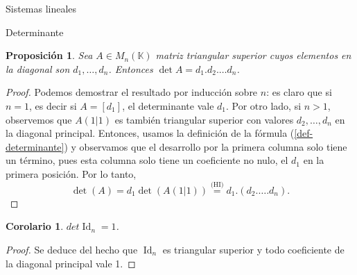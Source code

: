 \documentclass[a4paper,12pt,twoside,spanish,reqno]{amsbook}
\newtheorem{proposicion}[teorema]{Proposici\'on}
\newtheorem{corolario}[teorema]{Corolario}
\theoremstyle{definition}
\theoremstyle{remark}
\newcommand{\Id}{\operatorname{Id}}
\newcommand{\K}{\mathbb K}
\begin{document}
\begin{chapter}{Sistemas lineales}
\begin{section}{Determinante}
\begin{comment}
        En  el caso  que  $A$ sea triangular inferior también lo demostraremos por inducción. El caso $n=1$ es trivial. Si $n >1$, observemos que  $A(1|1)$ es también triangular inferior con valores $d_2,\ldots,d_n$  en la diagonal principal y si $i >1$, $A(i|1)$ es triangular inferior con el primer valor en la diagonal igual a 0. Por hipótesis inductiva $\det(A(1|1)) = d_2.\ldots.d_n$ y si $i >1$, $\det(A(i|1)) = 0\times \ldots = 0$, por lo tanto 
        \begin{equation*}
        \det(A) = d_1 \det(A(1|1))+ \sum_{i=2}^{n} a_{i1}\det(A(i|1)) =  d_1.(d_2.\ldots.d_n) + 0.
        \end{equation*} 
        \end{proof}
    \end{comment}

    \begin{proposicion}\label{det-triang-sup}
    Sea $A \in M_n(\K)$ matriz triangular  superior cuyos elementos en la diagonal son $d_1,\ldots,d_n$. Entonces $\det A = d_1.d_2.\ldots d_n$.
    \end{proposicion}
    \begin{proof} Podemos demostrar el resultado por inducción sobre $n$: es claro que si $n=1$,  es decir si $A = [d_1]$, el determinante vale $d_1$. Por otro lado, si $n>1$,  observemos que $A(1|1)$ es también triangular superior con valores $d_2,\ldots,d_n$  en la diagonal principal. Entonces,  usamos la definición de la fórmula (\ref{def-determinante}) y observamos que el desarrollo por la primera  columna solo tiene un término, pues esta columna solo tiene un coeficiente no nulo, el $d_1$ en la primera posición. Por lo tanto, 
        \begin{equation*}
        \det(A) = d_1 \det(A(1|1)) \stackrel{\text{(HI)}}{=} d_1.(d_2.\ldots.d_n).
        \end{equation*}
    \end{proof}
    
    \begin{corolario}
        $det \Id_n = 1$.
    \end{corolario}
    \begin{proof}
        Se deduce del hecho que $\Id_n$  es triangular superior y todo coeficiente de la diagonal principal vale 1.
    \end{proof}
    

\end{section}
\end{chapter}
\end{document}
